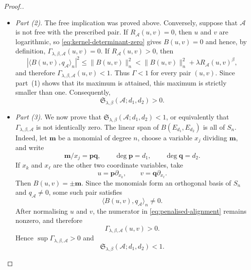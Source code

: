 \documentclass[pdflatex,sn-mathphys-num]{sn-jnl}%
\theoremstyle{remark}
\theoremstyle{definition}
\begin{document}
\begin{proof}[Proof.]
\begin{itemize}
\item \emph{Part (2).}
The free implication was proved above. Conversely, suppose that $\mathcal{A}$
is not free with the prescribed pair. If
$R_{\mathcal{A}}(u,v)=0$, then $u$ and $v$ are logarithmic, so
\eqref{eq:kernel-determinant-zero} gives $B(u,v)=0$ and hence, by definition,
$\Gamma_{\lambda,\beta,\mathcal{A}}(u,v)=0$. If
$R_{\mathcal{A}}(u,v)>0$, then
\[
|\langle B(u,v),q_{\mathcal{A}}\rangle_n|^2
\leq \|B(u,v)\|_n^2
<
\|B(u,v)\|_n^2+\lambda R_{\mathcal{A}}(u,v)^\beta,
\]
and therefore
$\Gamma_{\lambda,\beta,\mathcal{A}}(u,v)<1$. Thus $\Gamma<1$ for every
pair $(u,v)$. Since part~(1) shows that its maximum is attained, this maximum
is strictly smaller than one. Consequently,
\[
\mathfrak S_{\lambda,\beta}(\mathcal{A};d_1,d_2)>0.
\]

\item \emph{Part (3).}
We now prove that $\mathfrak S_{\lambda,\beta}(\mathcal{A};d_1,d_2)<1$, or equivalently that $\Gamma_{\lambda,\beta,\mathcal{A}}$ is not identically zero. The linear span of $B(E_{d_1},E_{d_2})$ is all of $S_n$. Indeed, let $\mathbf{m}$ be a monomial of degree $n$, choose a variable $x_j$ dividing $\mathbf{m}$, and write
\[
\mathbf{m}/x_j=\mathbf{pq},
\qquad
\deg \mathbf{p}=d_1,\qquad
\deg \mathbf{q}=d_2.
\]
If $x_k$ and $x_\ell$ are the other two coordinate variables, take
\[
u=\mathbf{p}\partial_{x_k},
\qquad
v=\mathbf{q}\partial_{x_\ell}.
\]
Then $B(u,v)=\pm \mathbf{m}$. Since the monomials form an orthogonal basis of $S_n$
and $q_{\mathcal{A}}\neq0$, some such pair satisfies
\[
\langle B(u,v),q_{\mathcal{A}}\rangle_n\neq0.
\]
After normalising $u$ and $v$, the numerator in \eqref{eq:penalised-alignment} remains nonzero, and therefore
\[
\Gamma_{\lambda,\beta,\mathcal{A}}(u,v)>0.
\]
Hence $\sup\Gamma_{\lambda,\beta,\mathcal{A}}>0$ and
\[
\mathfrak S_{\lambda,\beta}(\mathcal{A};d_1,d_2)<1.
\]



\end{itemize}
\end{proof}
\end{document}
